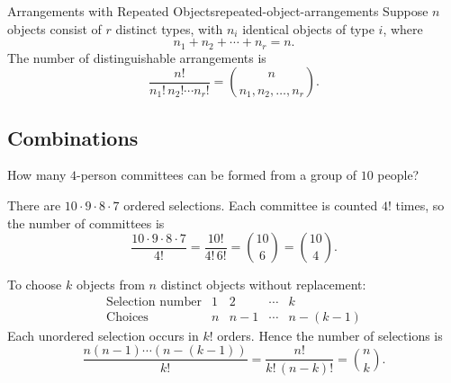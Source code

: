 \begin{theorem}{Arrangements with Repeated Objects}{repeated-object-arrangements}
  Suppose $n$ objects consist of $r$ distinct types, with $n_i$ identical objects of type $i$, where
  \[
    n_1+n_2+\cdots+n_r=n.
  \]
  The number of distinguishable arrangements is
  \[
    \frac{n!}{n_1!\,n_2!\cdots n_r!}
    = \binom{n}{n_1,n_2,\ldots,n_r}.
  \]
\end{theorem}

\subsection{Combinations}

\begin{example}
  How many $4$-person committees can be formed from a group of $10$ people?

  There are $10\cdot9\cdot8\cdot7$ ordered selections. Each committee is counted $4!$ times, so the number of committees is
  \[
    \frac{10\cdot9\cdot8\cdot7}{4!}
    = \frac{10!}{4!\,6!}
    = \binom{10}{6}
    = \binom{10}{4}.
  \]
\end{example}

To choose $k$ objects from $n$ distinct objects without replacement:
\[
  \begin{array}{c|cccc}
    \text{Selection number} & 1 & 2   & \cdots & k       \\
    \text{Choices}          & n & n-1 & \cdots & n-(k-1)
  \end{array}
\]
Each unordered selection occurs in $k!$ orders. Hence the number of selections is
\[
  \frac{n(n-1)\cdots(n-(k-1))}{k!}
  = \frac{n!}{k!\,(n-k)!}
  = \binom{n}{k}.
\]
